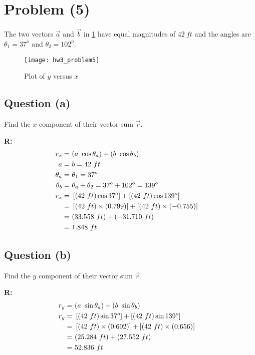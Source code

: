 \section{Problem (5)}
	The two vectors $\vec{a}$ and $\vec{b}$ in \cref{fig:hw3_problem5} have equal magnitudes of $42 \ ft$ and the angles are $\theta_{1} = 37^{o}$ and $\theta_{2} = 102^{o}$.

	\begin{figure}[H]
		\begin{center}
			\texttt{[image: hw3\_problem5]}
			\caption{Plot of $y$ versus $x$}
			\label{fig:hw3_problem5}
		\end{center}
	\end{figure}

	\subsection{Question (a)}
		Find the $x$ component of their vector sum $\vec{r}$.

		\textbf{R:} \newline
		\begin{align}
			r_{x} = \ &(a \ \cos{\theta_{a}}) + (b \ \cos{\theta_{b}})& \notag \\
			a = \ &b = 42 \ ft& \notag \\
			\theta_{a} = \ &\theta_{1} = 37^{o}& \notag \\
			\theta_{b} = \ &\theta_{a} + \theta_{2} = 37^{o} + 102^{o} = 139^{o}& \notag \\
			r_{x} = \ &\left[ (42 \ ft) \cos{37^{o}} \right] + \left[ (42 \ ft) \cos{139^{o}} \right]& \notag \\
			= \ &\left[ (42 \ ft) \times (0.799) \right] + \left[ (42 \ ft) \times (- 0.755) \right]& \notag \\
			= \ &(33.558 \ ft) + (-31.710 \ ft)& \notag \\
			= \ &1.848 \ ft&
		\end{align}

	\subsection{Question (b)}
		Find the $y$ component of their vector sum $\vec{r}$.

		\textbf{R:} \newline
		\begin{align}
			r_{y} = \ &(a \ \sin{\theta_{a}}) + (b \ \sin{\theta_{b}})& \notag \\
			r_{y} = \ &\left[ (42 \ ft) \sin{37^{o}} \right] + \left[ (42 \ ft) \sin{139^{o}} \right]& \notag \\
			= \ &\left[ (42 \ ft) \times (0.602) \right] + \left[ (42 \ ft) \times (0.656) \right]& \notag \\
			= \ &(25.284 \ ft) + (27.552 \ ft)& \notag \\
			= \ &52.836 \ ft&
		\end{align}

